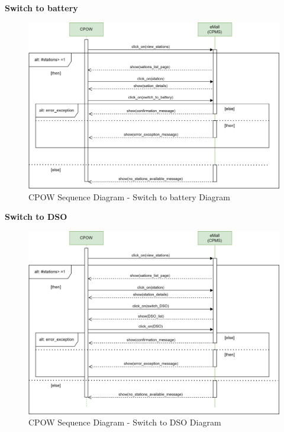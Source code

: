 \documentclass[table, 12pt]{article} %
\begin{document}
\begin{itemize}
            \textbf{Switch to battery}
            \begin{center}
                \begin{figure}[H]
                    \includegraphics[scale=0.55, center]{assets/sequenceDiagrams/Switch to Battery.png}
                    \caption{CPOW Sequence Diagram - Switch to battery Diagram}
                    \label{fig: Switch to battery}
                \end{figure}
            \end{center}

            \textbf{Switch to DSO}
            \begin{center}
                \begin{figure}[H]
                    \includegraphics[scale=0.55, center]{assets/sequenceDiagrams/Switch DSO.png}
                    \caption{CPOW Sequence Diagram - Switch to DSO Diagram}
                    \label{fig: Switch to DSO}
                \end{figure}
            \end{center}
           
        \end{itemize}
        \newpage
\end{document}
